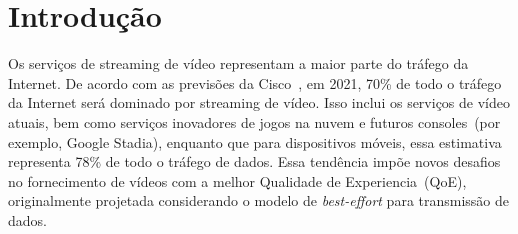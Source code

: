 \section{Introdução}
\label{ch:introduction}


\vspace{0.5cm}

Os serviços de streaming de vídeo representam a maior parte do tráfego da Internet. De acordo com as previsões da Cisco~\cite{cisco:forecast2017},
em 2021, 70\% de todo o tráfego da Internet será dominado por streaming de vídeo. Isso inclui os serviços de vídeo atuais, bem como serviços inovadores de jogos na nuvem e futuros consoles~(por exemplo, Google Stadia), enquanto que para dispositivos móveis, essa estimativa representa 78\% de todo o tráfego de dados. Essa tendência impõe novos desafios no fornecimento de vídeos com a melhor Qualidade de Experiencia~(QoE), originalmente projetada considerando o modelo de \textit{best-effort} para transmissão de dados.




